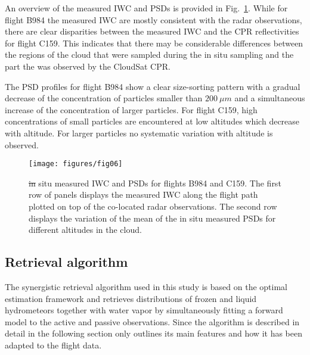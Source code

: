 \documentclass[journal abbreviation, manuscript]{copernicus}
\providecommand{\DIFadd}[1]{{\protect\color{blue}\uwave{#1}}} %
\providecommand{\DIFdel}[1]{{\protect\color{red}\sout{#1}}}                      %
\providecommand{\DIFdelend}{} %
\providecommand{\DIFaddFL}[1]{\DIFadd{#1}} %
\providecommand{\DIFdelFL}[1]{\DIFdel{#1}} %
\providecommand{\DIFaddbeginFL}{} %
\providecommand{\DIFaddendFL}{} %
\providecommand{\DIFdelbeginFL}{} %
\providecommand{\DIFdelendFL}{} %
\begin{document}
\DIFdelend An overview of the  measured IWC and PSDs is provided in Fig.~\ref{fig:in_situ}.
While for flight B984 the measured IWC are mostly consistent with the radar
observations, there are clear disparities between the measured IWC and the CPR
reflectivities for flight C159. This indicates that there may be considerable
differences between the regions of the cloud that were sampled during the
in situ sampling and the part the was observed by the CloudSat CPR.

The PSD profiles for flight B984 show a clear size-sorting pattern with a
gradual decrease of the concentration of particles smaller than $200\ \unit{\mu
  m}$ and a simultaneous increase of the concentration of larger particles. For
flight C159, high concentrations of small particles are encountered at low
altitudes which decrease with altitude. For larger particles no systematic
variation with altitude is observed.

\begin{figure}[hbpt!]
  \centering
  \texttt{[image: figures/fig06]}
  \caption{ \DIFdelbeginFL \DIFdelFL{in }\DIFdelendFL \DIFaddbeginFL \DIFaddFL{In }\DIFaddendFL situ measured IWC and PSDs for flights B984 and C159. The first
    row of panels displays the measured IWC along the flight path plotted on top
    of the co-located radar observations. The second row displays the variation
    of the mean of the in situ measured PSDs for different altitudes in the
    cloud.
    }
  \label{fig:in_situ}
\end{figure}

\subsection{Retrieval algorithm}
\label{sec:synergistic_retrieval}

The synergistic retrieval algorithm used in this study is based on the optimal
estimation framework \citep{rodgers00} and retrieves distributions of frozen and
liquid hydrometeors together with water vapor by simultaneously fitting a
forward model to the active and passive observations. Since the algorithm is
described in detail in \citet{pfreundschuh20} the following section only
outlines its main features and how it has been adapted to the flight data.
\end{document}
